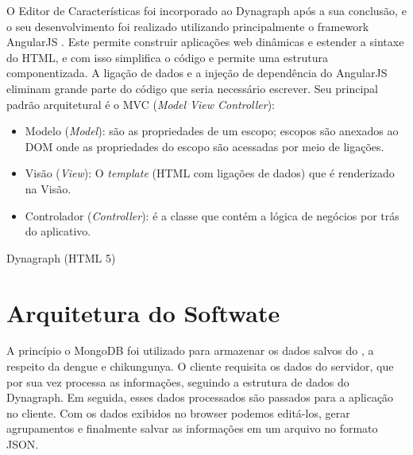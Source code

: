 O Editor de Características foi incorporado ao Dynagraph após a sua conclusão, e o seu desenvolvimento foi realizado utilizando principalmente o framework AngularJS \cite{angularjs}.
Este permite construir aplicações web dinâmicas e estender a sintaxe do HTML, e com isso simplifica o código e permite uma estrutura componentizada. A ligação de dados e a injeção de dependência do AngularJS eliminam grande parte do código que seria necessário escrever.
Seu principal padrão arquitetural é o MVC (\textit{Model View Controller}):
\begin{itemize}
	\item Modelo (\textit{Model}): são as propriedades de um escopo; escopos são anexados ao DOM onde as propriedades do escopo são acessadas por meio de ligações.
	\item Visão (\textit{View}): O \textit{template} (HTML com ligações de dados) que é renderizado na Visão.
	\item Controlador (\textit{Controller}): é a classe que contém a lógica de negócios por trás do aplicativo.
\end{itemize}


Dynagraph (HTML 5)

\section{Arquitetura do Softwate}
A princípio o MongoDB foi utilizado para armazenar os dados salvos do \cite{simda}, a respeito da dengue e chikungunya. O cliente requisita os dados do servidor, que por sua vez processa as informações, seguindo a estrutura de dados do Dynagraph. Em seguida, esses dados processados são passados para a aplicação no cliente. Com os dados exibidos no browser podemos editá-los, gerar agrupamentos e finalmente salvar as informações em um arquivo no formato JSON.

\begin{figure}[h]
	\centering	
\end{figure}
\FloatBarrier